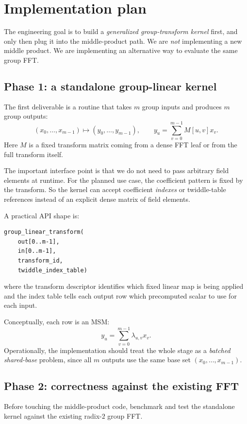 \documentclass[11pt]{article}
\begin{document}
\section{Implementation plan}

The engineering goal is to build a \emph{generalized group-transform kernel}
first, and only then plug it into the middle-product path.
We are \emph{not} implementing a new middle product.
We are implementing an alternative way to evaluate the same group FFT.

\subsection{Phase 1: a standalone group-linear kernel}

The first deliverable is a routine that takes $m$ group inputs and produces
$m$ group outputs:
\[
(x_0,\dots,x_{m-1}) \mapsto (y_0,\dots,y_{m-1}),
\qquad
y_u = \sum_{v=0}^{m-1} M[u,v] x_v.
\]
Here $M$ is a fixed transform matrix coming from a dense FFT leaf or from the
full transform itself.

The important interface point is that we do not need to pass arbitrary field
elements at runtime.
For the planned use case, the coefficient pattern is fixed by the transform.
So the kernel can accept coefficient \emph{indexes} or twiddle-table
references instead of an explicit dense matrix of field elements.

A practical API shape is:
\begin{lstlisting}
group_linear_transform(
    out[0..m-1],
    in[0..m-1],
    transform_id,
    twiddle_index_table)
\end{lstlisting}
where the transform descriptor identifies which fixed linear map is being
applied and the index table tells each output row which precomputed scalar to
use for each input.

Conceptually, each row is an MSM:
\[
y_u = \sum_{v=0}^{m-1} \lambda_{u,v} x_v.
\]
Operationally, the implementation should treat the whole stage as a
\emph{batched shared-base} problem, since all $m$ outputs use the same base set
$(x_0,\dots,x_{m-1})$.

\subsection{Phase 2: correctness against the existing FFT}

Before touching the middle-product code, benchmark and test the standalone
kernel against the existing radix-$2$ group FFT.
\end{document}

